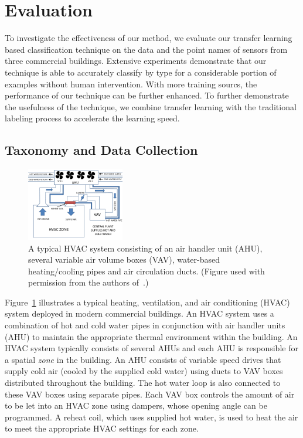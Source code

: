 \section{Evaluation}
To investigate the effectiveness of our method, we evaluate our transfer learning based classification technique on the data and the point names of sensors from three commercial buildings. Extensive experiments demonstrate that our technique is able to accurately classify by type for a considerable portion of examples without human intervention. With more training sourcs, the performance of our technique can be further enhanced.
To further demonstrate the usefulness of the technique, we combine transfer learning with the traditional labeling process to accelerate the learning speed.


\subsection{Taxonomy and Data Collection}
\begin{figure}[t]
\centering
\includegraphics[width=0.38\textwidth]{./fig/hvac}
\caption{A typical HVAC system consisting of an air handler unit (AHU), several variable air volume boxes (VAV), water-based heating/cooling pipes and air circulation ducts. (Figure used with permission from the authors of~\cite{sentinel}.)}
\label{fig:hvac}
\end{figure}

Figure~\ref{fig:hvac} illustrates a typical heating, ventilation, and air conditioning (HVAC) system deployed in modern commercial buildings. 
An HVAC system uses a combination of hot and cold water pipes in conjunction with
air handler units (AHU) to maintain the appropriate thermal environment within the building.
An HVAC system typically consists of several AHUs and each AHU is responsible for a spatial \emph{zone}
in the building. An AHU consists of variable speed drives that supply cold air
(cooled by the supplied cold water) using ducts to VAV boxes distributed throughout the building.
The hot water loop is also connected to these VAV boxes using separate pipes. Each VAV box
controls the amount of air to be let into an HVAC zone using dampers, whose opening angle
can be programmed. A reheat coil, which uses supplied hot water, is used to heat the air to
meet the appropriate HVAC settings for each zone.

